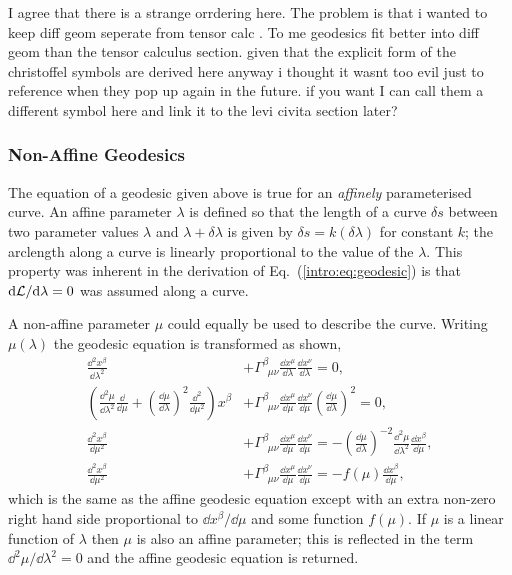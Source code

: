 \color{choral} I agree that there is a strange orrdering here. The problem is that i wanted to keep diff geom seperate from tensor calc . To me geodesics fit better into diff geom than the tensor calculus section. given that the explicit form of the christoffel symbols are derived here anyway i thought it wasnt too evil just to reference when they pop up again in the future. if you want I can call them a different symbol here and link it to the levi civita section later? \color{black}


\subsubsection*{Non-Affine Geodesics}
The equation of a geodesic given above is true for an {\it affinely} parameterised curve. An affine parameter $\lambda$ is defined so that the length of a curve $\delta s$ between two parameter values $\lambda$ and $\lambda+\delta \lambda$ is given by $\delta s = k (\delta \lambda)$ for constant $k$; the arclength along a curve is linearly proportional to the value of the $\lambda$. This property was inherent in the derivation of Eq.~(\ref{intro:eq:geodesic}) is that $\dd \mathcal{L} / \dd \lambda=0$ was assumed along a curve.

A non-affine parameter $\mu$ could equally be used to describe the curve. Writing $\mu(\lambda)$ the geodesic equation is transformed as shown,
\begin{align}
\frac{\dd ^2 {x}^\beta}{\dd \lambda^2} &+ \Gamma^\beta_{\,\,\,\mu\nu}\frac{\dd {x}^\mu}{\dd \lambda}\frac{\dd {x}^\nu}{\dd \lambda}=0,\\
\left(  \frac{\dd^2 \mu}{\dd \lambda^2} \frac{\dd}{\dd\mu}  + \left( \frac{\dd \mu}{\dd \lambda} \right)^2 \frac{\dd^2}{\dd \mu^2} \right) {x}^\beta     &+ \Gamma^\beta_{\,\,\,\mu\nu}\frac{\dd {x}^\mu}{\dd \mu}\frac{\dd {x}^\nu}{\dd \mu}\left( \frac{\dd \mu}{\dd \lambda} \right)^2=0,\\
    \frac{\dd^2 {x}^\beta }{\dd \mu^2}     &+ \Gamma^\beta_{\,\,\,\mu\nu}\frac{\dd {x}^\mu}{\dd \mu}\frac{\dd {x}^\nu}{\dd \mu}=- \left( \frac{\dd \mu}{\dd \lambda} \right)^{-2}\frac{\dd^2\mu}{\dd \lambda^2} \frac{\dd x^\beta}{\dd\mu},\\
    \frac{\dd^2 {x}^\beta }{\dd \mu^2}     &+ \Gamma^\beta_{\,\,\,\mu\nu}\frac{\dd {x}^\mu}{\dd \mu}\frac{\dd {x}^\nu}{\dd \mu}=- f(\mu) \frac{\dd x^\beta}{\dd\mu},
\end{align}
which is the same as the affine geodesic equation except with an extra non-zero right hand side proportional to $\dd x^\beta/\dd \mu$ and some function $f(\mu)$. If $\mu$ is a linear function of $\lambda$ then $\mu$ is also an affine parameter; this is reflected in the term $\dd^2 \mu / \dd \lambda^2=0$ and the affine geodesic equation is returned.

